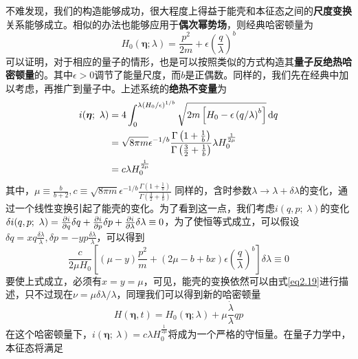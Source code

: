 不难发现，我们的构造能够成功，很大程度上得益于能壳和本征态之间的\textbf{尺度变换}关系能够成立。相似的办法也能够应用于\textbf{偶次幂势场}，则经典哈密顿量为
\begin{equation}
    H_{0}(\bm{\eta} ; \lambda)=\frac{p^{2}}{2 m}+\epsilon\left(\frac{q}{\lambda}\right)^{b}
    \label{eq2.26}
\end{equation}
可以证明，对于相应的量子的情形，也是可以按照类似的方式构造其\textbf{量子反绝热哈密顿量}的。其中$\epsilon > 0$调节了能量尺度，而$b$是正偶数。同样的，我们先在经典中加以考虑，再推广到量子中。上述系统的\textbf{绝热不变量}为
\begin{equation}
    \begin{split}
        i(\bm{\eta};\ \lambda) &= 4 \int_0^{\lambda \left(H_0 / \epsilon \right)^{1/b}} \sqrt{2 m \left[ H_0 -\epsilon \left(q/{\lambda}\right)^b\right]} \, \mathrm{d}q \\ 
        &= \sqrt{8 \pi m} \epsilon^{-1 / b} \frac{\Gamma\left(1+\frac{1}{b}\right)}{\Gamma\left(\frac{3}{2}+\frac{1}{b}\right)} \lambda H_0^{\frac{1}{2 \mu}}\\
        &= c \lambda H_0^{\frac{1}{2 \mu}}
    \end{split}
    \label{eq2.27}
\end{equation}
其中，$\mu \equiv \frac{b}{b+2} , c \equiv \sqrt{8 \pi m} \epsilon^{-1 / b} \frac{\Gamma\left(1+\frac{1}{b}\right)}{\Gamma\left(\frac{3}{2}+\frac{1}{b}\right)}$
同样的，含时参数$\lambda \to \lambda + \delta \lambda$的变化，通过一个线性变换引起了能壳的变化。为了看到这一点，我们考虑$i(q, p;\ \lambda)$的变化$\delta i(q, p;\ \lambda) = \frac{\partial i}{\partial q} \delta q + \frac{\partial i}{\partial p} \delta p + \frac{\partial i}{\partial \lambda} \delta \lambda \equiv 0$，为了使恒等式成立，可以假设$\delta q = x q \frac{\delta \lambda}{\lambda}, \delta p = - y p \frac{\delta \lambda}{\lambda}$，可以得到
\begin{equation}
    \frac{c}{2 \mu H_0} \left[ (\mu - y) \frac{p^2}{m} + (2 \mu - b + b x) \epsilon \left( \frac{q}{\lambda} \right)^b \right] \delta \lambda \equiv 0
    \label{eq2.28}
\end{equation}
要使上式成立，必须有$x=y=\mu$，可见，能壳的变换依然可以由式\eqref{eq2.19}进行描述，只不过现在$\nu = \mu \delta \lambda / \lambda$，同理我们可以得到新的哈密顿量
\begin{equation}
    H(\bm{\eta}, t)=H_{0}(\bm{\eta} ; \lambda)+\mu \frac{\dot{\lambda}}{\lambda} q p
    \label{eq2.28.5}
\end{equation}
在这个哈密顿量下，$i(\bm{\eta};\ \lambda) = c \lambda H_0^{\frac{1}{2 \mu}}$将成为一个严格的守恒量。在量子力学中，本征态将满足
